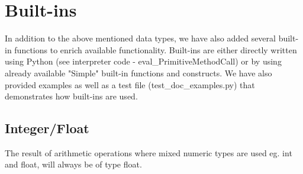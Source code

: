 \documentclass{article}
\begin{document}
\section{Built-ins}
\label{bins}
In addition to the above mentioned data types, we have also added several built-in functions to enrich available functionality. Built-ins are either directly written using Python (see interpreter code - eval\_PrimitiveMethodCall) or by using already available "Simple" built-in functions and constructs. We have also provided examples as well as a test file (test\_doc\_examples.py) that demonstrates how built-ins are used.

\subsection{Integer/Float}
\label{intfloat}
	The result of arithmetic operations where mixed numeric types are used eg. int and float, will always be of type float.
\end{document}
